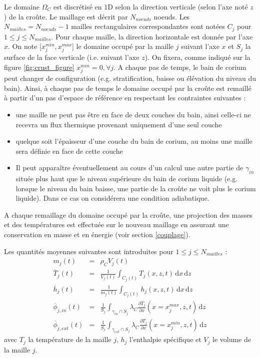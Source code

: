 Le domaine $\Omega_C$ est discrétisé en 1D selon la direction verticale (selon l'axe noté $z$) de la croûte. Le maillage est décrit par $N_{noeuds}$ noeuds. Les $N_{mailles}=N_{noeuds}-1$ mailles rectangulaires correspondantes sont notées $C_j$ pour $1 \leq j\leq N_{mailles}$. Pour chaque maille, la direction horizontale est donnée par l'axe $x$. On note [$x_j^{min}, x_j^{max}$] le domaine occupé par la maille $j$ suivant l'axe $x$ et $S_j$ la surface de la face verticale (i.e. suivant l'axe $z$). On fixera, comme indiqué sur la figure \ref{fig:crust_figure} $x_j^{min}=0,\forall j$. A chaque pas de temps, le bain de corium peut changer de configuration (e.g. stratification, baisse ou élévation du niveau du bain). Ainsi, à chaque pas de temps le domaine occupé par la croûte est remaillé à partir d'un pas d'espace de référence en respectant les contraintes suivantes :
\begin{itemize}
    \item une maille ne peut pas être en face de deux couches du bain, ainsi celle-ci ne recevra un flux thermique provenant uniquement d'une seul couche
    \item quelque soit l'épaisseur d'une couche du bain de corium, au moins une maille sera définie en face de cette couche
    \item  Il peut apparaître éventuellement au cours d'un calcul une autre partie de $\gamma_{in}$ située plus haut que le niveau supérieure du bain de corium liquide (e.g. lorsque le niveau du bain baisse, une partie de la croûte ne voit plus le corium liquide). Dans ce cas on considérera une condition adiabatique.
\end{itemize}
A chaque remaillage du domaine occupé par la croûte, une projection des masses et des températures est effectuée sur le nouveau maillage en assurant une conservation en masse et en énergie (voir section \ref{couplage}).

Les quantités moyennes suivantes sont introduites pour $1 \leq j\leq N_{mailles}$ :
\begin{eqnarray}
m_{j}(t) &=& \rho_C  V_j(t) \\
\overline{T}_{j}(t) &=& \frac{1}{V_j(t)} \int_{C_j(t)} T_{j}(x,z,t)\,\mathrm{d}x\, \mathrm{d}z\\
\overline{h}_j(t) &=& \frac{1}{m_j(t)} \int_{C_j(t)} h_j(x,z,t)\,\mathrm{d}x\, \mathrm{d}z\\
\overline{\phi}_{j,in}(t) &=& \frac{1}{S_j}\int_{\gamma_{in}\cap S_j}\lambda_C \frac{\partial T_{j}}{\partial x}(x=x_j^{max},z,t)\, \mathrm{d}z  \label{eq:phi_j_in}\\
\overline{\phi}_{j,ext}(t) &=& \frac{1}{S_j}\int_{\gamma_{ext}\cap S_j}\lambda_C \frac{\partial T_{j}}{\partial x} (x=x_j^{min},z,t)\, \mathrm{d}z  \label{eq:phi_j_ext}
\end{eqnarray}
avec $T_{j}$ la température de la maille $j$, $h_j$ l'enthalpie spécifique et $V_j$ le volume de la maille $j$.\\

